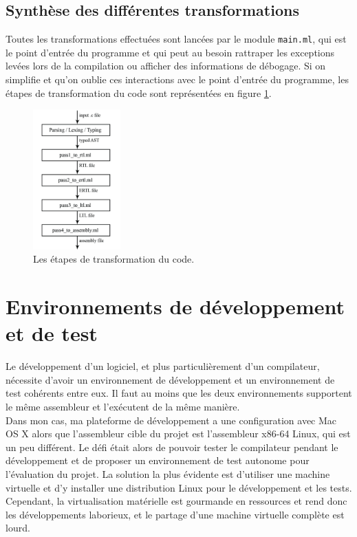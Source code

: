 \documentclass[paper=a4, fontsize=11pt]{scrartcl}
\numberwithin{figure}{section}			%
\numberwithin{table}{section}				%
\begin{document}
\subsection{Synthèse des différentes transformations}

Toutes les transformations effectuées sont lancées par le module \texttt{main.ml}, qui est le point d'entrée du programme et qui peut au besoin rattraper les exceptions levées lors de la compilation ou afficher des informations de débogage. Si on simplifie et qu'on oublie ces interactions avec le point d'entrée du programme, les étapes de transformation du code sont représentées en figure \ref{transformations}.

\begin{figure}[!ht]
    \center
    \includegraphics[width=0.3\textwidth]{./images/transformation_flow.jpg}
    \caption{\label{transformations} Les étapes de transformation du code.}
\end{figure}

\section{Environnements de développement et de test}

Le développement d'un logiciel, et plus particulièrement d'un compilateur, nécessite d'avoir un environnement de développement et un environnement de test cohérents entre eux. Il faut au moins que les deux environnements supportent le même assembleur et l'exécutent de la même manière.\\

Dans mon cas, ma plateforme de développement a une configuration avec Mac OS X alors que l'assembleur cible du projet est l'assembleur x86-64 Linux, qui est un peu différent. Le défi était alors de pouvoir tester le compilateur pendant le développement et de proposer un environnement de test autonome pour l'évaluation du projet. La solution la plus évidente est d'utiliser une machine virtuelle et d'y installer une distribution Linux pour le développement et les tests. Cependant, la virtualisation matérielle est gourmande en ressources et rend donc les développements laborieux, et le partage d'une machine virtuelle complète est lourd.\\
\end{document}
